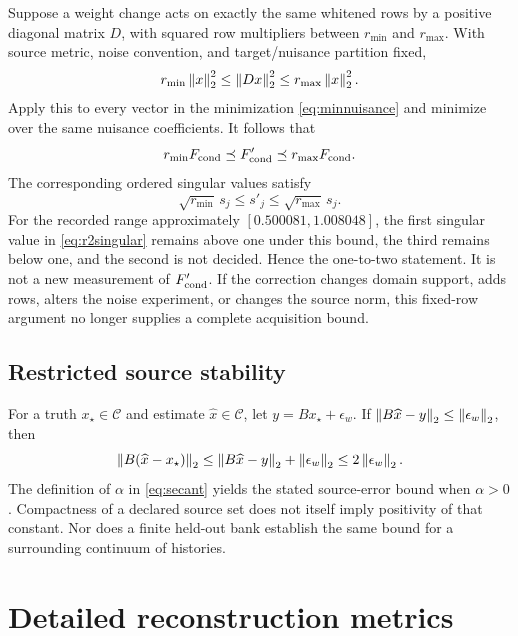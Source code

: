 Suppose a weight change acts on exactly the same whitened rows by a positive diagonal matrix $D$, with squared row multipliers between $r_{\min}$ and $r_{\max}$. With source metric, noise convention, and target/nuisance partition fixed,
\begin{equation}
r_{\min}\left\lVert x\right\rVert_2^2\leq\left\lVert Dx\right\rVert_2^2\leq r_{\max}\left\lVert x\right\rVert_2^2.
\end{equation}
Apply this to every vector in the minimization \eqref{eq:minnuisance} and minimize over the same nuisance coefficients. It follows that
\begin{equation}
r_{\min}F_{\rm cond}\preceq F'_{\rm cond}\preceq r_{\max}F_{\rm cond}.
\label{eq:reweightloewner}
\end{equation}
The corresponding ordered singular values satisfy
\begin{equation}
\sqrt{r_{\min}}\,s_j\leq s'_j\leq\sqrt{r_{\max}}\,s_j.
\label{eq:weylbound}
\end{equation}
For the recorded range approximately $[0.500081,1.008048]$, the first singular value in \eqref{eq:r2singular} remains above one under this bound, the third remains below one, and the second is not decided. Hence the one-to-two statement. It is not a new measurement of $F'_{\rm cond}$. If the correction changes domain support, adds rows, alters the noise experiment, or changes the source norm, this fixed-row argument no longer supplies a complete acquisition bound.

\subsection{Restricted source stability}
For a truth $x_\star\in\mathcal C$ and estimate $\widehat x\in\mathcal C$, let $y=Bx_\star+\epsilon_w$. If $\left\lVert B\widehat x-y\right\rVert_2\leq\left\lVert\epsilon_w\right\rVert_2$, then
\begin{equation}
\left\lVert B(\widehat x-x_\star)\right\rVert_2
\leq\left\lVert B\widehat x-y\right\rVert_2+\left\lVert\epsilon_w\right\rVert_2
\leq2\left\lVert\epsilon_w\right\rVert_2.
\end{equation}
The definition of $\alpha$ in \eqref{eq:secant} yields the stated source-error bound when $\alpha>0$. Compactness of a declared source set does not itself imply positivity of that constant. Nor does a finite held-out bank establish the same bound for a surrounding continuum of histories.

\section{Detailed reconstruction metrics}\label{app:metrics}
